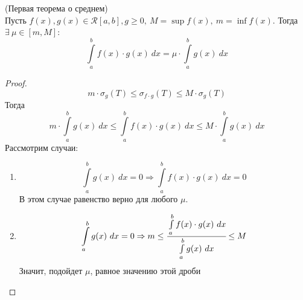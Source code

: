\begin{theorem} (Первая теорема о среднем)\\
    Пусть $f(x), g(x) \in \mathcal{R}[a, b], g \geq 0,\ M = \sup f(x),\ m = \inf f(x)$. Тогда\\
    $\exists\ \mu\in [m,M]$:
    \[\int\limits_{a}^{b}f(x)\cdot g(x)\ dx = \mu\cdot\int\limits_{a}^{b}g(x)\ dx\]
\end{theorem}
\begin{proof}
    \[m\cdot \sigma_g(T) \leq \sigma_{f\cdot g}(T) \leq M\cdot\sigma_g(T)\]
    Тогда
    \[m\cdot \int\limits_{a}^{b} g(x)\ dx \leq \int\limits_{a}^{b} f(x)\cdot g(x)\ dx \leq M\cdot\int\limits_{a}^{b} g(x)\ dx\]
    Рассмотрим случаи:
    \begin{enumerate}
        \item 
        \[\int\limits_{a}^{b} g(x)\ dx = 0 \Rightarrow \int\limits_{a}^{b} f(x)\cdot g(x)\ dx = 0\]
        В этом случае равенство верно для любого $\mu$.
        \item
        \[\int\limits_{a}^{b} g(x)\ dx = 0 \Rightarrow m\leq \cfrac{\int\limits_{a}^{b} f(x)\cdot g(x)\ dx}{\int\limits_{a}^{b} g(x)\ dx}\leq M\]
        Значит, подойдет $\mu$, равное значению этой дроби
    \end{enumerate}
\end{proof}
